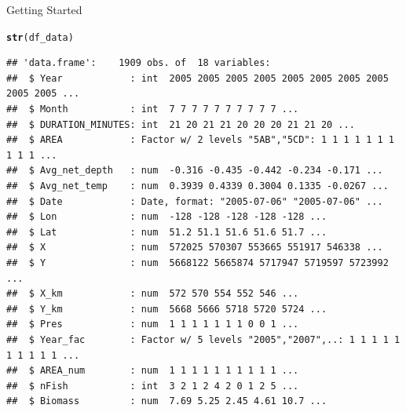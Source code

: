 \documentclass{beamer}\usepackage[]{graphicx}\usepackage[]{color}
\makeatletter
\newcommand{\hlstd}[1]{\textcolor[rgb]{0.345,0.345,0.345}{#1}}%
\newcommand{\hlkwd}[1]{\textcolor[rgb]{0.737,0.353,0.396}{\textbf{#1}}}%
\newenvironment{kframe}{%
 \def\at@end@of@kframe{}%
 \ifinner\ifhmode%
  \def\at@end@of@kframe{\end{minipage}}%
  \begin{minipage}{\columnwidth}%
 \fi\fi%
 \def\FrameCommand##1{\hskip\@totalleftmargin \hskip-\fboxsep
 \colorbox{shadecolor}{##1}\hskip-\fboxsep
     \hskip-\linewidth \hskip-\@totalleftmargin \hskip\columnwidth}%
 \MakeFramed {\advance\hsize-\width
   \@totalleftmargin\z@ \linewidth\hsize
   \@setminipage}}%
 {\par\unskip\endMakeFramed%
 \at@end@of@kframe}
\newenvironment{knitrout}{}{} %
\makeatother
\begin{document}
\begin{frame}[fragile]{Getting Started}
\begin{knitrout}\scriptsize
{}\color{fgcolor}\begin{kframe}
\begin{alltt}
  \hlkwd{str}\hlstd{(df_data)}
\end{alltt}
\begin{verbatim}
## 'data.frame':	1909 obs. of  18 variables:
##  $ Year            : int  2005 2005 2005 2005 2005 2005 2005 2005 2005 2005 ...
##  $ Month           : int  7 7 7 7 7 7 7 7 7 7 ...
##  $ DURATION_MINUTES: int  21 20 21 21 20 20 20 21 21 20 ...
##  $ AREA            : Factor w/ 2 levels "5AB","5CD": 1 1 1 1 1 1 1 1 1 1 ...
##  $ Avg_net_depth   : num  -0.316 -0.435 -0.442 -0.234 -0.171 ...
##  $ Avg_net_temp    : num  0.3939 0.4339 0.3004 0.1335 -0.0267 ...
##  $ Date            : Date, format: "2005-07-06" "2005-07-06" ...
##  $ Lon             : num  -128 -128 -128 -128 -128 ...
##  $ Lat             : num  51.2 51.1 51.6 51.6 51.7 ...
##  $ X               : num  572025 570307 553665 551917 546338 ...
##  $ Y               : num  5668122 5665874 5717947 5719597 5723992 ...
##  $ X_km            : num  572 570 554 552 546 ...
##  $ Y_km            : num  5668 5666 5718 5720 5724 ...
##  $ Pres            : num  1 1 1 1 1 1 1 0 0 1 ...
##  $ Year_fac        : Factor w/ 5 levels "2005","2007",..: 1 1 1 1 1 1 1 1 1 1 ...
##  $ AREA_num        : num  1 1 1 1 1 1 1 1 1 1 ...
##  $ nFish           : int  3 2 1 2 4 2 0 1 2 5 ...
##  $ Biomass         : num  7.69 5.25 2.45 4.61 10.7 ...
\end{verbatim}
\end{kframe}
\end{knitrout}
\end{frame}

\end{document}
